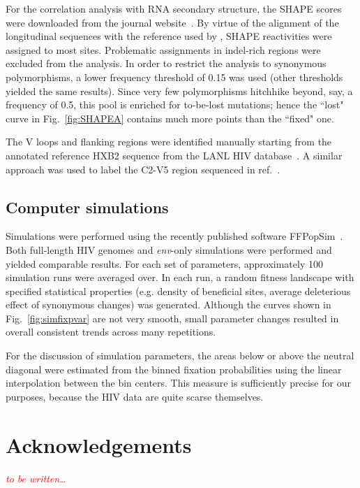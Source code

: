 \documentclass[rmp, twocolumn]{revtex4}
\newcommand{\comment}[1]{\textit{\textcolor{red}{#1}}}
\newcommand{\FIG}[1]{Fig.~\ref{fig:#1}}
\newcommand{\env}{\textit{env}}
\begin{document}
For the correlation analysis with RNA secondary structure, the SHAPE scores were
downloaded from the journal website~\citep{watts_architecture_2009}. By virtue
of the alignment of the longitudinal sequences with the reference used by
\citet{watts_architecture_2009}, SHAPE reactivities were assigned to most sites.
Problematic assignments in indel-rich regions were excluded from the analysis.
In order to restrict the analysis to synonymous polymorphisms, a lower frequency
threshold of 0.15 was used (other thresholds yielded the same results). Since
very few polymorphisms hitchhike beyond, say, a frequency of 0.5, this pool is
enriched for to-be-lost mutations; hence the ``lost" curve in \FIG{SHAPEA}
contains much more points than the ``fixed" one.

The V loops and flanking regions were identified manually starting from the
annotated reference HXB2 sequence from the LANL HIV database~\citep{LANL2012}. A
similar approach was used to label the C2-V5 region sequenced in
ref.~\citep{shankarappa_consistent_1999}.

\subsection{Computer simulations}
Simulations were performed using the recently published software
FFPopSim~\citep{zanini_ffpopsim:_2012}. Both full-length HIV genomes and
\env{}-only simulations were performed and yielded comparable results. For each
set of parameters, approximately 100 simulation runs were averaged over. In each
run, a random fitness landscape with specified statistical properties (e.g.
density of beneficial sites, average deleterious effect of synonymous changes) was generated.
Although the curves shown in \FIG{simfixpvar} are not very smooth, small
parameter changes resulted in overall consistent trends across many repetitions.

For the discussion of simulation parameters, the areas below or above the neutral
diagonal were estimated from the binned fixation probabilities using the linear
interpolation between the bin centers. This measure is sufficiently precise for
our purposes, because the HIV data are quite scarse themselves.

\section*{Acknowledgements}
\comment{to be written\dots}




\end{document}
